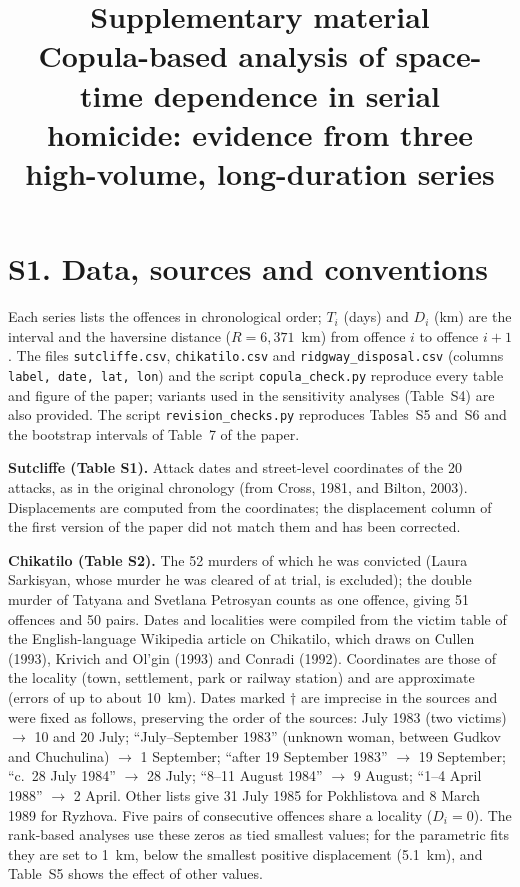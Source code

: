 \documentclass[11pt,a4paper]{article}
\title{\textbf{Supplementary material}\\[0.3em]\large Copula-based analysis of space-time dependence in serial homicide: evidence from three high-volume, long-duration series}
\date{}
\begin{document}
\maketitle

\section*{S1. Data, sources and conventions}
Each series lists the offences in chronological order; $T_i$ (days) and $D_i$ (km) are the interval and the haversine distance ($R=6{,}371$~km) from offence $i$ to offence $i+1$. The files \texttt{sutcliffe.csv}, \texttt{chikatilo.csv} and \texttt{ridgway\_disposal.csv} (columns \texttt{label, date, lat, lon}) and the script \texttt{copula\_check.py} reproduce every table and figure of the paper; variants used in the sensitivity analyses (Table~S4) are also provided. The script \texttt{revision\_checks.py} reproduces Tables~S5 and~S6 and the bootstrap intervals of Table~7 of the paper.

\textbf{Sutcliffe (Table S1).} Attack dates and street-level coordinates of the 20 attacks, as in the original chronology (from Cross, 1981, and Bilton, 2003). Displacements are computed from the coordinates; the displacement column of the first version of the paper did not match them and has been corrected.

\textbf{Chikatilo (Table S2).} The 52 murders of which he was convicted (Laura Sarkisyan, whose murder he was cleared of at trial, is excluded); the double murder of Tatyana and Svetlana Petrosyan counts as one offence, giving 51 offences and 50 pairs. Dates and localities were compiled from the victim table of the English-language Wikipedia article on Chikatilo, which draws on Cullen (1993), Krivich and Ol'gin (1993) and Conradi (1992). Coordinates are those of the locality (town, settlement, park or railway station) and are approximate (errors of up to about 10~km). Dates marked $\dagger$ are imprecise in the sources and were fixed as follows, preserving the order of the sources: July 1983 (two victims) $\to$ 10 and 20 July; ``July--September 1983'' (unknown woman, between Gudkov and Chuchulina) $\to$ 1 September; ``after 19 September 1983'' $\to$ 19 September; ``c.\ 28 July 1984'' $\to$ 28 July; ``8--11 August 1984'' $\to$ 9 August; ``1--4 April 1988'' $\to$ 2 April. Other lists give 31 July 1985 for Pokhlistova and 8 March 1989 for Ryzhova. Five pairs of consecutive offences share a locality ($D_i=0$). The rank-based analyses use these zeros as tied smallest values; for the parametric fits they are set to 1~km, below the smallest positive displacement (5.1~km), and Table~S5 shows the effect of other values.
\end{document}
